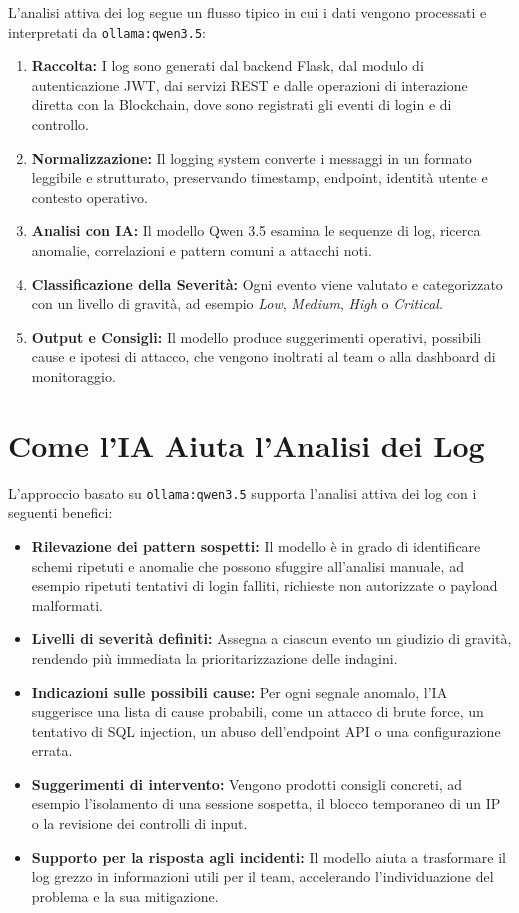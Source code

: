 L'analisi attiva dei log segue un flusso tipico in cui i dati vengono processati e interpretati da \texttt{ollama:qwen3.5}:

\begin{enumerate}
    \item \textbf{Raccolta:} I log sono generati dal backend Flask, dal modulo di autenticazione JWT, dai servizi REST e dalle operazioni di interazione diretta con la Blockchain, dove sono registrati gli eventi di login e di controllo.
    \item \textbf{Normalizzazione:} Il logging system converte i messaggi in un formato leggibile e strutturato, preservando timestamp, endpoint, identità utente e contesto operativo.
    \item \textbf{Analisi con IA:} Il modello Qwen 3.5 esamina le sequenze di log, ricerca anomalie, correlazioni e pattern comuni a attacchi noti.
    \item \textbf{Classificazione della Severità:} Ogni evento viene valutato e categorizzato con un livello di gravità, ad esempio \textit{Low}, \textit{Medium}, \textit{High} o \textit{Critical}.
    \item \textbf{Output e Consigli:} Il modello produce suggerimenti operativi, possibili cause e ipotesi di attacco, che vengono inoltrati al team o alla dashboard di monitoraggio.
\end{enumerate}

\section{Come l'IA Aiuta l'Analisi dei Log}

L'approccio basato su \texttt{ollama:qwen3.5} supporta l'analisi attiva dei log con i seguenti benefici:

\begin{itemize}
    \item \textbf{Rilevazione dei pattern sospetti:} Il modello è in grado di identificare schemi ripetuti e anomalie che possono sfuggire all'analisi manuale, ad esempio ripetuti tentativi di login falliti, richieste non autorizzate o payload malformati.
    \item \textbf{Livelli di severità definiti:} Assegna a ciascun evento un giudizio di gravità, rendendo più immediata la prioritarizzazione delle indagini.
    \item \textbf{Indicazioni sulle possibili cause:} Per ogni segnale anomalo, l'IA suggerisce una lista di cause probabili, come un attacco di brute force, un tentativo di SQL injection, un abuso dell'endpoint API o una configurazione errata.
    \item \textbf{Suggerimenti di intervento:} Vengono prodotti consigli concreti, ad esempio l'isolamento di una sessione sospetta, il blocco temporaneo di un IP o la revisione dei controlli di input.
    \item \textbf{Supporto per la risposta agli incidenti:} Il modello aiuta a trasformare il log grezzo in informazioni utili per il team, accelerando l'individuazione del problema e la sua mitigazione.
\end{itemize}

